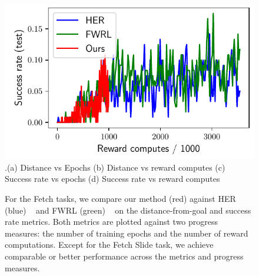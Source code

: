 \begin{figure}
  \includegraphics[width=\frac\columnwidth]{media/res/6efc1de-path_reward_low_thresh_chosen-FetchSlidePR-v1-dqst/reward_computes-test/success_rate.pdf}\\
  {.\tiny\color{blue}\hspace{0.8cm}(a) Distance vs Epochs \hspace{1.05cm}(b) Distance vs
    reward computes
    \hspace{0.70cm} (c) Success rate vs epochs \hspace{0.9cm} (d) Success rate vs reward computes}
    \caption{For the Fetch tasks, we compare our method (red) against HER (blue) ~\citep{andrychowicz2016learning}
    and FWRL (green) ~\citep{dhiman2018floydwarshall} on the distance-from-goal
    and success rate metrics. Both metrics are plotted
    against two progress measures: the number of training epochs and the number of reward
    computations. Except for the Fetch Slide task, we achieve comparable or
    better performance across the metrics and progress measures. 
    }%
  \label{fig:fetch-results}%
\end{figure}
